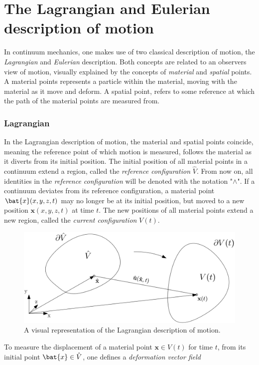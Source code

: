 \section{The Lagrangian and Eulerian description of motion}
In continuum mechanics, one makes use of two classical description of motion, the \textit{Lagrangian} and \textit{Eulerian} description. Both concepts are related to an observers view of motion, visually explained by the concepts of \textit{material} and \textit{spatial} points. A material points represents a particle within the material, moving with the material as it move and deform. A spatial point, refers to some reference at which the path of the material points are measured from. 

\subsubsection*{Lagrangian}
In the Lagrangian description of motion, the material and spatial points coincide, meaning the reference point of which motion is measured, follows the material as it diverts from its initial position. The initial position of all material points in a continuum extend a region, called the \textit{reference configuration} $\hat{V}$. From now on, all identities in the \textit{reference configuration} will be denoted with the notation "$\wedge$". If a continuum deviates from its reference configuration, a material point $\bat{x}(x, y, z ,t)$ may no longer be at its initial position, but moved to a new position $\mathbf{x}(x, y, z, t)$ at time $t$.  The new positions of all material points extend a new region, called the \textit{current configuration} $V(t)$. 
\begin{figure}[h!]
  \centering
    \includegraphics[scale=0.4]{./Fig/lagframe.png}
      \caption{A visual representation of the Lagrangian description of motion.}
\end{figure}
\newpage
To measure the displacement of a material point $\mathbf{x} \in V(t)$ for time $t$, from its initial point $\bat{x} \in \hat{V}$, one defines a \textit{deformation vector field} 
